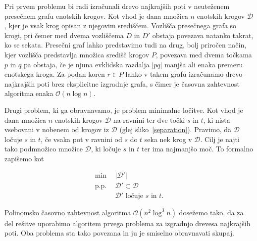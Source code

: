 \documentclass[a4paper, 12pt]{book}
\newcommand{\D}{\ensuremath{\mathcal{D}}}
\newcommand{\OO}{\ensuremath{\mathcal{O}}} %
\begin{document}
Pri prvem problemu bi radi izračunali drevo najkrajših poti v neuteženem presečnem grafu enotskih krogov. Kot vhod je dana množica $n$ enotskih krogov $\D$, kjer je vsak krog opisan z njegovim središčem. Vozlišča presečnega grafa so krogi, pri čemer med dvema vozliščema $D$ in $D'$ obstaja povezava natanko takrat, ko se sekata. Presečni graf lahko predstavimo tudi na drug, bolj priročen način, kjer vozlišča predstavlja množica središč krogov $P$, povezava med dvema točkama $p$ in $q$ pa obstaja, če je njuna evklidska razdalja $|pq|$ manjša ali enaka premeru enotskega kroga. Za podan koren $r \in P$ lahko v takem grafu izračunamo drevo najkrajših poti brez eksplicitne izgradnje grafa, s čimer je časovna zahtevnost algoritma enaka $\OO(n\log n)$.

Drugi problem, ki ga obravnavamo, je problem minimalne ločitve. Kot vhod je dana množica $n$ enotskih krogov $\D$ na ravnini ter dve točki $s$ in $t$, ki nista vsebovani v nobenem od krogov iz $\D$ (glej sliko~\ref{separation}). Pravimo, da $\D$ ločuje $s$ in $t$, če vsaka pot v ravnini od $s$ do $t$ seka nek krog v $\D$. Cilj je najti tako podmnožico množice $\D$, ki ločuje $s$ in $t$ ter ima najmanjšo moč. To formalno zapišemo kot 

\begin{align*}
	\min ~~		& |\D'|\\
	 \mbox{p.p.}~~ & \D'\subset \D\\
				&	\D'\text{ ločuje $s$ in $t$}. 
\end{align*}

Polinomsko časovno zahtevnost algoritma $\OO(n^2\log^3n)$ dosežemo tako, da za del rešitve uporabimo algoritem prvega problema za izgradnjo drevesa najkrajših poti. Oba problema sta tako povezana in ju je smiselno obravnavati skupaj.
\end{document}
